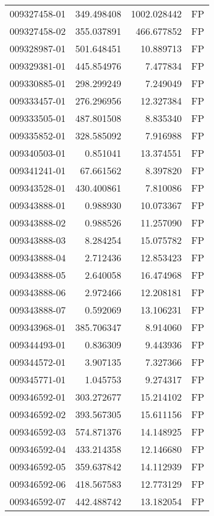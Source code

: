 \begin{tabular}{lrrl}
009327458-01 &  349.498408 &  1002.028442 &   FP \\
009327458-02 &  355.037891 &   466.677852 &   FP \\
009328987-01 &  501.648451 &    10.889713 &   FP \\
009329381-01 &  445.854976 &     7.477834 &   FP \\
009330885-01 &  298.299249 &     7.249049 &   FP \\
009333457-01 &  276.296956 &    12.327384 &   FP \\
009333505-01 &  487.801508 &     8.835340 &   FP \\
009335852-01 &  328.585092 &     7.916988 &   FP \\
009340503-01 &    0.851041 &    13.374551 &   FP \\
009341241-01 &   67.661562 &     8.397820 &   FP \\
009343528-01 &  430.400861 &     7.810086 &   FP \\
009343888-01 &    0.988930 &    10.073367 &   FP \\
009343888-02 &    0.988526 &    11.257090 &   FP \\
009343888-03 &    8.284254 &    15.075782 &   FP \\
009343888-04 &    2.712436 &    12.853423 &   FP \\
009343888-05 &    2.640058 &    16.474968 &   FP \\
009343888-06 &    2.972466 &    12.208181 &   FP \\
009343888-07 &    0.592069 &    13.106231 &   FP \\
009343968-01 &  385.706347 &     8.914060 &   FP \\
009344493-01 &    0.836309 &     9.443936 &   FP \\
009344572-01 &    3.907135 &     7.327366 &   FP \\
009345771-01 &    1.045753 &     9.274317 &   FP \\
009346592-01 &  303.272677 &    15.214102 &   FP \\
009346592-02 &  393.567305 &    15.611156 &   FP \\
009346592-03 &  574.871376 &    14.148925 &   FP \\
009346592-04 &  433.214358 &    12.146680 &   FP \\
009346592-05 &  359.637842 &    14.112939 &   FP \\
009346592-06 &  418.567583 &    12.773129 &   FP \\
009346592-07 &  442.488742 &    13.182054 &   FP \\

\end{tabular}
